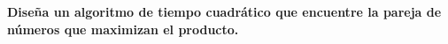 \textbf{Diseña un algoritmo de tiempo cuadrático que encuentre la pareja de números que maximizan el producto.}\vspace{.2cm}

\textcolor{bibi}{}
\begin{quote}
\end{quote}